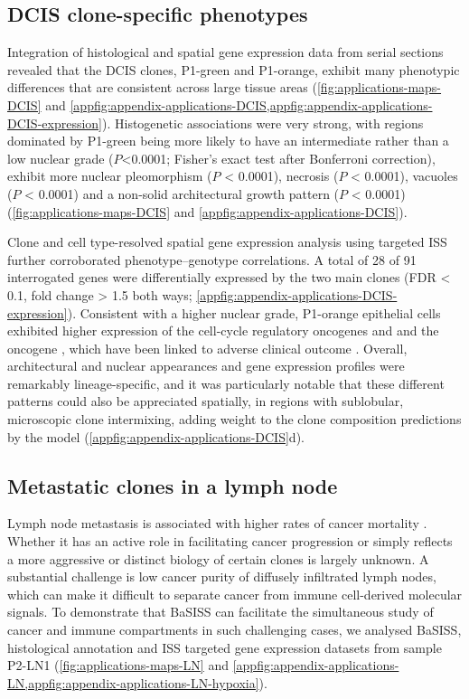 \subsection{DCIS clone-specific phenotypes}

Integration of histological and spatial gene expression data from serial sections revealed that the DCIS clones, P1-green and P1-orange, exhibit many phenotypic differences that are consistent across large tissue areas (\cref{fig:applications-maps-DCIS} and \cref{appfig:appendix-applications-DCIS,appfig:appendix-applications-DCIS-expression}). Histogenetic associations were very strong, with regions dominated by P1-green being more likely to have an intermediate rather than a low nuclear grade ($P$<0.0001; Fisher’s exact test after Bonferroni correction), exhibit more nuclear pleomorphism ($P$ < 0.0001), necrosis ($P$ < 0.0001), vacuoles ($P$ < 0.0001) and a non-solid architectural growth pattern ($P$ < 0.0001) (\cref{fig:applications-maps-DCIS} and \cref{appfig:appendix-applications-DCIS}).

Clone and cell type-resolved spatial gene expression analysis using targeted \ac{ISS} further corroborated phenotype–genotype correlations. A total of 28 of 91 interrogated genes were differentially expressed by the two main clones (\ac{FDR} < 0.1, fold change > 1.5 both ways; \cref{appfig:appendix-applications-DCIS-expression}). Consistent with a higher nuclear grade, P1-orange epithelial cells exhibited higher expression of the cell-cycle regulatory oncogenes  and  and the oncogene , which have been linked to adverse clinical outcome \parencite{Solin2013-zy}. Overall, architectural and nuclear appearances and gene expression profiles were remarkably lineage-specific, and it was particularly notable that these different patterns could also be appreciated spatially, in regions with sublobular, microscopic clone intermixing, adding weight to the clone composition predictions by the model (\cref{appfig:appendix-applications-DCIS}d).

\subsection{Metastatic clones in a lymph node}
\label{sec:applications-LN}
Lymph node metastasis is associated with higher rates of cancer mortality . Whether it has an active role in facilitating cancer progression or simply reflects a more aggressive or distinct biology of certain clones is largely unknown. A substantial challenge is low cancer purity of diffusely infiltrated lymph nodes, which can make it difficult to separate cancer from immune cell-derived molecular signals. To demonstrate that \ac{BaSISS} can facilitate the simultaneous study of cancer and immune compartments in such challenging cases, we analysed \ac{BaSISS}, histological annotation and \ac{ISS} targeted gene expression datasets from sample P2-LN1 (\cref{fig:applications-maps-LN} and \cref{appfig:appendix-applications-LN,appfig:appendix-applications-LN-hypoxia}).

